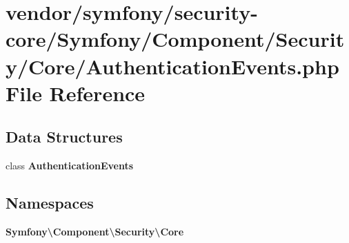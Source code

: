 \section{vendor/symfony/security-\/core/\+Symfony/\+Component/\+Security/\+Core/\+Authentication\+Events.php File Reference}
\label{_authentication_events_8php}
\subsection*{Data Structures}
\begin{DoxyCompactItemize}
\item 
class {\bf Authentication\+Events}
\end{DoxyCompactItemize}
\subsection*{Namespaces}
\begin{DoxyCompactItemize}
\item 
 {\bf Symfony\textbackslash{}\+Component\textbackslash{}\+Security\textbackslash{}\+Core}
\end{DoxyCompactItemize}
